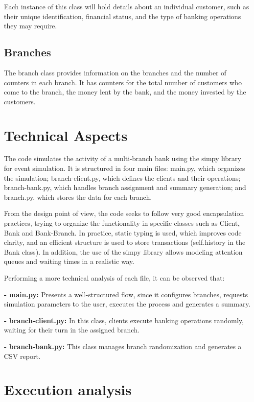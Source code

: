 \documentclass[titlepage, 12pt]{article}
\begin{document}
Each instance of this class will hold details about an individual customer, such as their unique identification, financial status, and the type of banking operations they may require.

\subsection{Branches}
The branch class provides information on the branches and the number of counters in each branch. It has counters for the total number of customers who come to the branch, the money lent by the bank, and the money invested by the customers.

\newpage

\section{Technical Aspects}
The code simulates the activity of a multi-branch bank using the simpy library for event simulation. It is structured in four main files: main.py, which organizes the simulation; branch-client.py, which defines the clients and their operations; branch-bank.py, which handles branch assignment and summary generation; and branch.py, which stores the data for each branch.

From the design point of view, the code seeks to follow very good encapsulation practices, trying to organize the functionality in specific classes such as Client, Bank and Bank-Branch. In practice, static typing is used, which improves code clarity, and an efficient structure is used to store transactions (self.history in the Bank class). In addition, the use of the simpy library allows modeling attention queues and waiting times in a realistic way.

Performing a more technical analysis of each file, it can be observed that: 

\textbf{- main.py:} Presents a well-structured flow, since it configures branches, requests simulation parameters to the user, executes the process and generates a summary. 

\textbf{- branch-client.py:} In this class, clients execute banking operations randomly, waiting for their turn in the assigned branch. 

\textbf{- branch-bank.py:} This class manages branch randomization and generates a CSV report.

\newpage

\section{Execution analysis}
\end{document}

